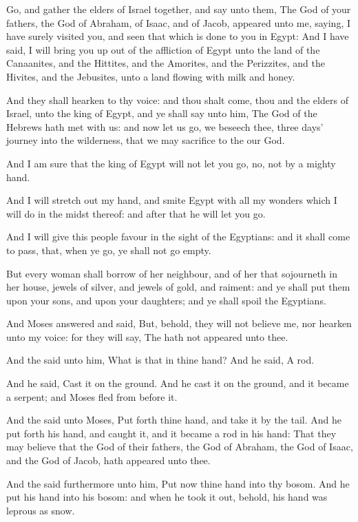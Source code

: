 \Verse Go, and gather the elders of Israel together, and say unto them, The \LORD God of your fathers, the God of Abraham, of Isaac, and of Jacob, appeared unto me, saying, I have surely visited you, and seen that which is done to you in Egypt: \Verse And I have said, I will bring you up out of the affliction of Egypt unto the land of the Canaanites, and the Hittites, and the Amorites, and the Perizzites, and the Hivites, and the Jebusites, unto a land flowing with milk and honey.

\Verse And they shall hearken to thy voice: and thou shalt come, thou and the elders of Israel, unto the king of Egypt, and ye shall say unto him, The \LORD God of the Hebrews hath met with us: and now let us go, we beseech thee, three days' journey into the wilderness, that we may sacrifice to the \LORD our God.

\Verse And I am sure that the king of Egypt will not let you go, no, not by a mighty hand.

\Verse And I will stretch out my hand, and smite Egypt with all my wonders which I will do in the midst thereof: and after that he will let you go.

\Verse And I will give this people favour in the sight of the Egyptians: and it shall come to pass, that, when ye go, ye shall not go empty.

\Verse But every woman shall borrow of her neighbour, and of her that sojourneth in her house, jewels of silver, and jewels of gold, and raiment: and ye shall put them upon your sons, and upon your daughters; and ye shall spoil the Egyptians.

\Chapter
\Verse And Moses answered and said, But, behold, they will not believe me, nor hearken unto my voice: for they will say, The \LORD hath not appeared unto thee.

\Verse And the \LORD said unto him, What is that in thine hand? And he said, A rod.

\Verse And he said, Cast it on the ground. And he cast it on the ground, and it became a serpent; and Moses fled from before it.

\Verse And the \LORD said unto Moses, Put forth thine hand, and take it by the tail. And he put forth his hand, and caught it, and it became a rod in his hand: \Verse That they may believe that the \LORD God of their fathers, the God of Abraham, the God of Isaac, and the God of Jacob, hath appeared unto thee.

\Verse And the \LORD said furthermore unto him, Put now thine hand into thy bosom. And he put his hand into his bosom: and when he took it out, behold, his hand was leprous as snow.

